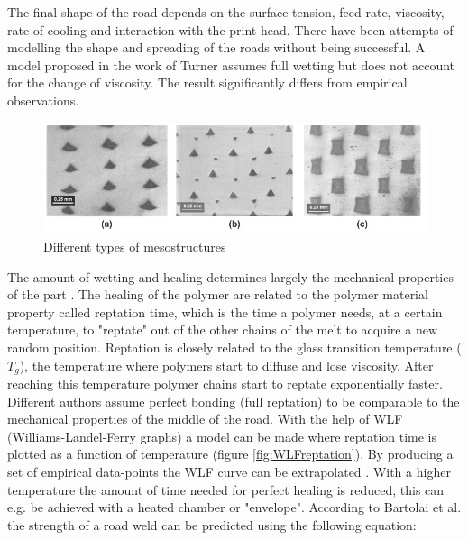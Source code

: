 The final shape of the road depends on the surface tension, feed rate, viscosity, rate of cooling and interaction with the print head. There have been attempts of modelling the shape and spreading of the roads without being successful. A model proposed in the work of Turner \cite{Turner2014AModeling} assumes full wetting but does not account for the change of viscosity. The result significantly differs from empirical observations. 

\begin{figure}[H]
    \centering
    \includegraphics[width=1\textwidth]{chapter_2/figures/Mesostructure.PNG}
    \caption{Different types of mesostructures \cite{Rodriguez2001MechanicalInvestigation}}
    \label{fig:mesostructure}
\end{figure}

The amount of wetting and healing determines largely  the mechanical properties of the part \cite{Sun2008}. The healing of the polymer are related to the polymer material property called reptation time, which is the time a polymer needs, at a certain temperature, to "reptate" out of the other chains of the melt to acquire a new random position. Reptation is closely related to the glass transition temperature ($T_g$), the temperature where polymers start to diffuse and lose viscosity. After reaching this temperature polymer chains start to reptate exponentially faster. Different authors \cite{Mcilroy2017DisentanglementManufacturing}  \cite{Hart2018IncreasedAnnealing} \cite{Bartolai2016PredictingManufacturing} assume perfect bonding (full reptation) to be comparable to the mechanical properties of the middle of the road. With the help of WLF (Williams-Landel-Ferry graphs) a model can be made where reptation time is plotted as a function of temperature (figure \ref{fig:WLFreptation}). By producing a set of empirical data-points the WLF curve can be extrapolated \cite{Peterson2019ReviewPerspective}. With a higher temperature the amount of time needed for perfect healing is reduced, this can e.g. be achieved with a heated chamber or "envelope". According to Bartolai et al. \cite{Bartolai2016PredictingManufacturing} the strength of a road weld can be predicted using the following equation:


